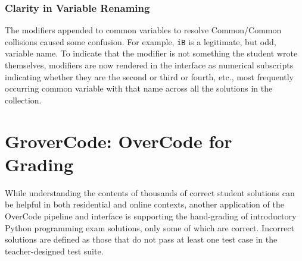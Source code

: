 


\subsubsection{Clarity in Variable Renaming}
The modifiers appended to common variables to resolve Common/Common collisions caused some confusion. For example, \texttt{iB} is a legitimate, but odd, variable name. To indicate that the modifier is not something the student wrote themselves, modifiers are now rendered in the interface as numerical subscripts indicating whether they are the second or third or fourth, etc., most frequently occurring common variable with that name across all the solutions in the collection.

\section{GroverCode: OverCode for Grading}\label{sec:grover}

While understanding the contents of thousands of correct student solutions can be helpful in both residential and online contexts, another application of the OverCode pipeline and interface is supporting the hand-grading of introductory Python programming exam solutions, only some of which are correct. Incorrect solutions are defined as those that do not pass at least one test case in the teacher-designed test suite.

